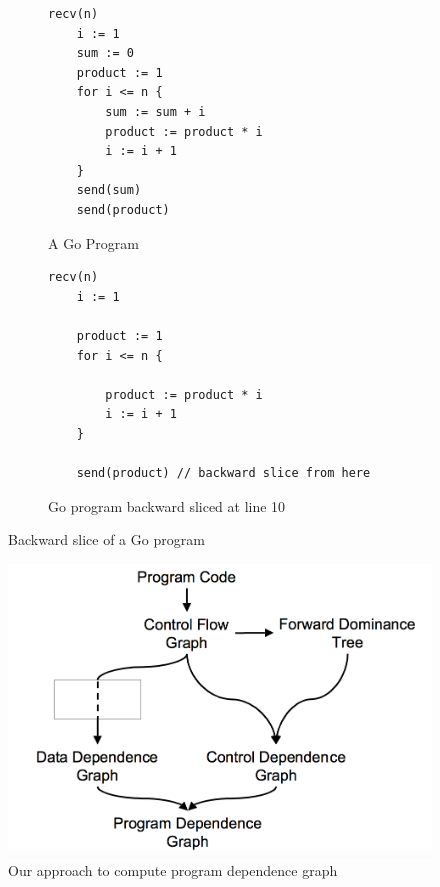 \begin{figure}
\begin{subfigure}[b]{\linewidth}
\centering
 \begin{lstlisting}[]
	recv(n)
	i := 1
	sum := 0
	product := 1
	for i <= n {
		sum := sum + i
		product := product * i
		i := i + 1
	}
	send(sum)
	send(product)
\end{lstlisting}
        \vspace{-2mm}
                \caption{A Go Program}
        \end{subfigure}

\begin{subfigure}[b]{\linewidth}
\centering
\begin{lstlisting}[]
	recv(n)
	i := 1

	product := 1
	for i <= n {
		
		product := product * i
		i := i + 1
	}
	
	send(product) // backward slice from here
\end{lstlisting}
        \vspace{-2mm}
                \caption{Go program backward sliced at line 10}
        \end{subfigure}
                        \caption{Backward slice of a Go program \cite{Tip} }
                \label{Fig:backslice}
\end{figure}


\begin{figure}
  \includegraphics[width=\columnwidth,scale=0.5]{images/PDG-approach.png}
  \caption{Our approach to compute program dependence graph}
  \label{fig:pdg}
\end{figure}


